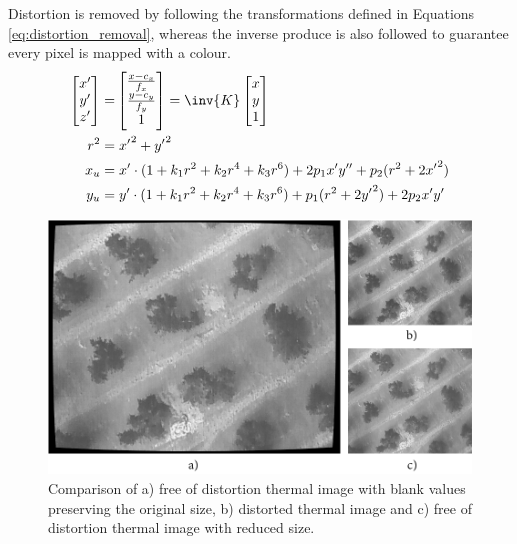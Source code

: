 Distortion is removed by following the transformations defined in Equations \ref{eq:distortion_removal}, whereas the inverse produce is also followed to guarantee every pixel is mapped with a colour.
\begin{gather}
    \label{eq:distortion_removal}
    \begin{aligned}
    \begin{bmatrix} 
        x'\\y'\\ z'
    \end{bmatrix}
    =& 
    \begin{bmatrix}
        \frac{x - c_x}{f_x}\\\frac{y - c_y}{f_y}\\ 1
    \end{bmatrix}
    = 
    \inv{K} \begin{bmatrix}
        x\\ y\\ 1
    \end{bmatrix}\\
    r^2 =& \hspace{1mm} {x'}^2 + {y'}^2\\
    x_u =& \hspace{1mm} x' \cdot (1 + k_1r^2 + k_2r^4 + k_3r^6) + 2p_1{x'}{y''} + p_2(r^2 + 2{x'}^2)\\
    y_u =& \hspace{1mm} y' \cdot (1 + k_1r^2 + k_2r^4 + k_3r^6) + p_1(r^2 + 2{y'}^2) +2p_2{x'}{y'}
    \end{aligned}
\end{gather}

\begin{figure}[hbt]
	\centering
	\includegraphics{figs/materials/thermal_distortion_2.png}
	\caption{Comparison of a) free of distortion thermal image with blank values preserving the original size, b) distorted thermal image and c) free of distortion thermal image with reduced size.}
	\label{fig:thermal_undistortion}
\end{figure}

